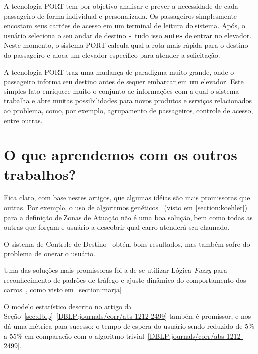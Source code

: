 A tecnologia PORT tem por objetivo analisar e prever a necessidade de cada
passageiro de forma individual e personalizada. Os passageiros simplesmente
encostam seus cartões de acesso em um terminal de leitura do sistema. Após, o
usuário seleciona o seu andar de destino~-~tudo isso \textbf{antes} de entrar no
elevador. Neste momento, o sistema PORT calcula qual a rota mais rápida para o
destino do passageiro e aloca um elevador específico para atender a solicitação.

A tecnologia PORT traz uma mudança de paradigma muito grande, onde o passageiro
informa seu destino antes de sequer embarcar em um elevador. Este simples fato
enriquece muito o conjunto de informações com a qual o sistema trabalha e abre
muitas possibilidades para novos produtos e serviços relacionados ao problema,
como, por exemplo, agrupamento de passageiros, controle de acesso, entre outras.

\section{\label{section:aprendemos}O que aprendemos com os outros trabalhos?}

Fica claro, com base nestes artigos, que algumas idéias são mais promissoras que
outras. Por exemplo, o uso de algoritmos genéticos~\cite{KOEHLEROTTIGER02} (visto
em~\ref{section:koehler}) para a definição de Zonas de Atuação não é uma boa
solução, bem como todas as outras que forçam o usuário a descobrir qual carro
atenderá seu chamado.

O sistema de Controle de Destino~\cite{KOEHLEROTTIGER02} obtém bons resultados,
mas também sofre do problema de onerar o usuário.

Uma das soluções mais promissoras foi a de se utilizar Lógica~\textit{Fuzzy}
para reconhecimento de padrões de tráfego e ajuste dinâmico do comportamento dos
carros~\cite{marja97}, como visto em~\ref{section:marja}

O modelo estatístico descrito no artigo da
Seção~\ref{sec:dblp}~\ref{DBLP:journals/corr/abs-1212-2499} também é promissor,
e nos dá uma métrica para sucesso: o tempo de espera do usuário sendo reduzido
de 5\% a 55\% em comparação com o algoritmo trivial~\ref{DBLP:journals/corr/abs-1212-2499}.